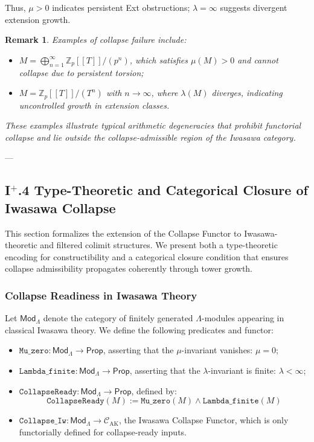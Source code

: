 \documentclass[11pt]{article}
\newtheorem{remark}[theorem]{Remark}
\begin{document}
Thus, $\mu > 0$ indicates persistent Ext obstructions; $\lambda = \infty$ suggests divergent extension growth.

\begin{remark}
Examples of collapse failure include:
\begin{itemize}
  \item $M = \bigoplus_{n=1}^\infty \mathbb{Z}_p[[T]]/(p^n)$, which satisfies $\mu(M) > 0$ and cannot collapse due to persistent torsion;
  \item $M = \mathbb{Z}_p[[T]]/(T^n)$ with $n \to \infty$, where $\lambda(M)$ diverges, indicating uncontrolled growth in extension classes.
\end{itemize}
These examples illustrate typical arithmetic degeneracies that prohibit functorial collapse and lie outside the collapse-admissible region of the Iwasawa category.
\end{remark}

---

\subsection*{I$^{+}$.4 Type-Theoretic and Categorical Closure of Iwasawa Collapse}

This section formalizes the extension of the Collapse Functor to Iwasawa-theoretic and filtered colimit structures. We present both a type-theoretic encoding for constructibility and a categorical closure condition that ensures collapse admissibility propagates coherently through tower growth.

\subsubsection*{Collapse Readiness in Iwasawa Theory}

Let $\mathsf{Mod}_\Lambda$ denote the category of finitely generated $\Lambda$-modules appearing in classical Iwasawa theory. We define the following predicates and functor:

\begin{itemize}
    \item $\texttt{Mu\_zero} : \mathsf{Mod}_\Lambda \to \mathsf{Prop}$, asserting that the $\mu$-invariant vanishes: $\mu = 0$;

    \item $\texttt{Lambda\_finite} : \mathsf{Mod}_\Lambda \to \mathsf{Prop}$, asserting that the $\lambda$-invariant is finite: $\lambda < \infty$;

    \item $\texttt{CollapseReady} : \mathsf{Mod}_\Lambda \to \mathsf{Prop}$, defined by:
    \[
    \texttt{CollapseReady}(M) := \texttt{Mu\_zero}(M) \land \texttt{Lambda\_finite}(M)
    \]

    \item $\texttt{Collapse\_Iw} : \mathsf{Mod}_\Lambda \to \mathcal{C}_{\mathrm{AK}}$, the Iwasawa Collapse Functor, which is only functorially defined for collapse-ready inputs.
\end{itemize}
\end{document}
